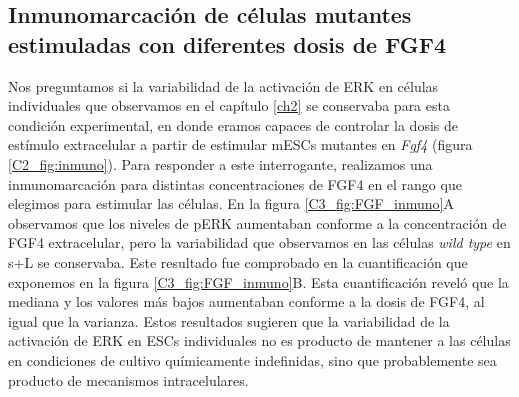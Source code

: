 \documentclass[./main.tex]{subfiles}
\begin{document}
\begin{subappendices}

\chapter{Inmunomarcación de células mutantes estimuladas con diferentes dosis de FGF4}
\label{C3_ap:inmuno}

Nos preguntamos si la variabilidad de la activación de ERK en células individuales que observamos en el capítulo \ref{ch2} se conservaba para esta condición experimental, en donde eramos capaces de controlar la dosis de estímulo extracelular a partir de estimular mESCs mutantes en \textit{Fgf4} (figura \ref{C2_fig:inmuno}). Para responder a este interrogante, realizamos una inmunomarcación para distintas concentraciones de FGF4 en el rango que elegimos para estimular las células. En la figura \ref{C3_fig:FGF_inmuno}A observamos que los niveles de pERK aumentaban conforme a la concentración de FGF4 extracelular, pero la variabilidad que observamos en las células \textit{wild type} en s+L se conservaba. Este resultado fue comprobado en la cuantificación que exponemos en la figura \ref{C3_fig:FGF_inmuno}B. Esta cuantificación reveló que la mediana y los valores más bajos aumentaban conforme a la dosis de FGF4, al igual que la varianza. Estos resultados sugieren que la variabilidad de la activación de ERK en ESCs individuales no es producto de mantener a las células en condiciones de cultivo químicamente indefinidas, sino que probablemente sea producto de mecanismos intracelulares. 




\end{subappendices}
\end{document}
